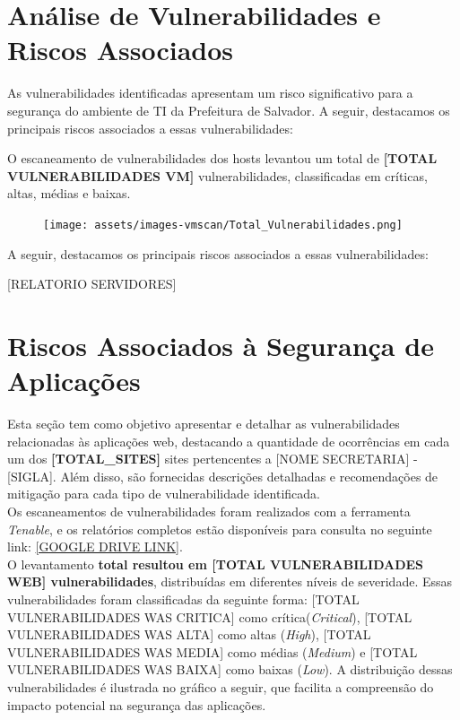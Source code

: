 \documentclass[a4paper,12pt]{article}
\begin{document}
\section{Análise de Vulnerabilidades e Riscos Associados}
As vulnerabilidades identificadas apresentam um risco significativo para a segurança do ambiente de TI da Prefeitura de Salvador. A seguir, destacamos os principais riscos associados a essas vulnerabilidades:

O escaneamento de vulnerabilidades dos hosts levantou um total de \textbf{[TOTAL VULNERABILIDADES VM]} vulnerabilidades, classificadas em críticas, altas, médias e baixas.

   \begin{figure}[h!]
    \centering
    \texttt{[image: assets/images-vmscan/Total\_Vulnerabilidades.png]} 
    \end{figure}
    \FloatBarrier

A seguir, destacamos os principais riscos associados a essas vulnerabilidades: 

[RELATORIO SERVIDORES]

\section{Riscos Associados à Segurança de Aplicações}

Esta seção tem como objetivo apresentar e detalhar as vulnerabilidades relacionadas às aplicações web, destacando a quantidade de ocorrências em cada um dos \textbf{[TOTAL_SITES]} sites pertencentes a [NOME SECRETARIA] - [SIGLA]. Além disso, são fornecidas descrições detalhadas e recomendações de mitigação para cada tipo de vulnerabilidade identificada.\\

Os escaneamentos de vulnerabilidades foram realizados com a ferramenta \textit{Tenable}, e os relatórios completos estão disponíveis para consulta no seguinte link: \url{[GOOGLE DRIVE LINK]}.\\

O levantamento \textbf{total resultou em [TOTAL VULNERABILIDADES WEB] vulnerabilidades}, distribuídas em diferentes níveis de severidade. Essas vulnerabilidades foram classificadas da seguinte forma: [TOTAL VULNERABILIDADES WAS CRITICA] como crítica(\textit{Critical}), [TOTAL VULNERABILIDADES WAS ALTA] como altas (\textit{High}), [TOTAL VULNERABILIDADES WAS MEDIA] como médias (\textit{Medium}) e [TOTAL VULNERABILIDADES WAS BAIXA] como baixas (\textit{Low}). A distribuição dessas vulnerabilidades é ilustrada no gráfico a seguir, que facilita a compreensão do impacto potencial na segurança das aplicações.
\end{document}
